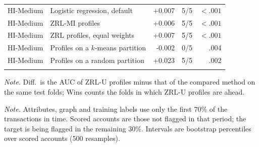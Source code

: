 \begin{table}[t]
{\begin{tabular}{@{}llrrr@{}}
HI-Medium & Logistic regression, default & +0.007 & 5/5 & $<.001$ \\
HI-Medium & ZRL-MI profiles & +0.006 & 5/5 & $<.001$ \\
HI-Medium & ZRL profiles, equal weights & +0.007 & 5/5 & $<.001$ \\
HI-Medium & Profiles on a $k$-means partition & -0.002 & 0/5 & .004 \\
HI-Medium & Profiles on a random partition & +0.023 & 5/5 & .002 \\
\addlinespace
\bottomrule
\end{tabular}}
\par\vspace{3pt}\parbox{0.98\columnwidth}{\footnotesize \emph{Note.} Diff.\ is the AUC of ZRL-U profiles minus that of the compared method on the same test folds; Wins counts the folds in which ZRL-U profiles are ahead.}
\end{table}

\begin{table}[t]
\caption{Time-based test: accounts first flagged after the cut-off, scored with attributes and labels from before it}
\label{tab:temporal}
\centering
\footnotesize
{}
\par\vspace{3pt}\parbox{0.98\columnwidth}{\footnotesize \emph{Note.} Attributes, graph and training labels use only the first 70\% of the transactions in time. Scored accounts are those not flagged in that period; the target is being flagged in the remaining 30\%. Intervals are bootstrap percentiles over scored accounts (500 resamples).}
\end{table}

